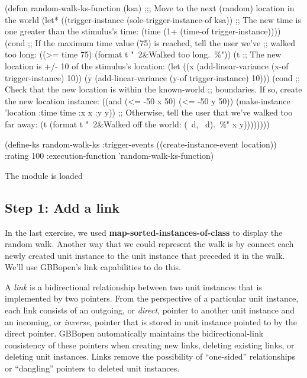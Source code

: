 \documentclass[10pt,twoside,english,pdftex]{article}
\begin{document}
\begin{example}
  (defun random-walk-ks-function (ksa)
    ;;; Move to the next (random) location in the world
    (let* ((trigger-instance (sole-trigger-instance-of ksa))
           ;; The new time is one greater than the stimulus's time:
           (time (1+ (time-of trigger-instance))))
      (cond
       ;; If the maximum time value (75) is reached, tell the user we've
       ;; walked too long:
       ((>= time 75) (format t "~2&Walked too long.~\%"))
       (t ;; The new location is +/- 10 of the stimulus's location:
        (let ((x (add-linear-variance (x-of trigger-instance) 10))
              (y (add-linear-variance (y-of trigger-instance) 10)))
          (cond
           ;; Check that the new location is within the known-world
           ;; boundaries.  If so, create the new location instance:
           ((and (<= -50 x 50) (<= -50 y 50))
            (make-instance 'location 
              :time time 
              :x x 
              :y y))
           ;; Otherwise, tell the user that we've walked too far away:
           (t (format t "~2&Walked off the world: (~d, ~d).~\%" x y))))))))

  (define-ks random-walk-ks
      :trigger-events ((create-instance-event location))
      :rating 100
      :execution-function 'random-walk-ks-function)
\end{example}

\begin{tightitemize}
\item The  module is loaded
\end{tightitemize}

\subsection*{Step 1: Add  a link}

In the last exercise, we used \textbf{map-sorted-instances-of-class} to
display the random walk.  Another way that we could represent the walk is by
connect each newly created  unit instance to the
 unit instance that preceded it in the walk.  We'll use
GBBopen's link capabilities to do this.

A \textit{link} is a bidirectional relationship between two unit instances
that is implemented by two pointers. From the perspective of a particular unit
instance, each link consists of an outgoing, or \textit{direct}, pointer to
another unit instance and an incoming, or \textit{inverse}, pointer that is
stored in unit instance pointed to by the direct pointer.  GBBopen
automatically maintains the bidirectional-link consistency of these pointers
when creating new links, deleting existing links, or deleting unit instances.
Links remove the possibility of ``one-sided'' relationships or ``dangling''
pointers to deleted unit instances.
\end{document}
